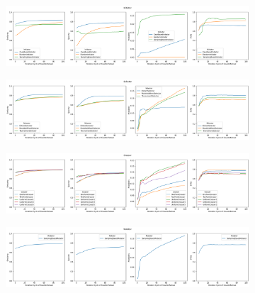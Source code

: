 
\begin{figure}[htbp]
    \centering
    \begin{subfigure}[c]{0.9\textwidth}
        \centering
        \includegraphics[width=\textwidth]{figures/generated/exp1_initiator.png}
        \label{fig:exp1-feasibility}    
    \end{subfigure}
    \hfill
    \begin{subfigure}[c]{0.9\textwidth}
        \centering
        \includegraphics[width=\textwidth]{figures/generated/exp1_selector.png}
        \label{fig:exp1-similarity}
    \end{subfigure}
    \hfill
    \begin{subfigure}[c]{0.9\textwidth}
        \centering
        \includegraphics[width=\textwidth]{figures/generated/exp1_crosser.png}
        \label{fig:exp1-feasibility}    
    \end{subfigure}
    \hfill
    \begin{subfigure}[c]{0.9\textwidth}
        \centering
        \includegraphics[width=\textwidth]{figures/generated/exp1_mutator.png}

\end{subfigure}
\end{figure}

